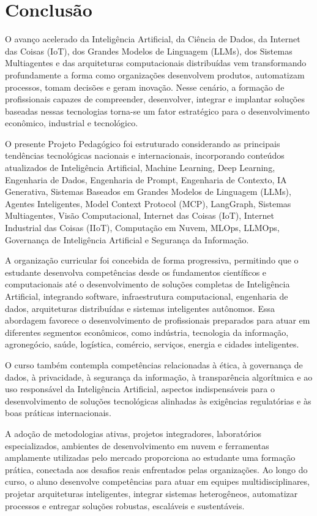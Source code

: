 \chapter{Conclusão}

O avanço acelerado da Inteligência Artificial, da Ciência de Dados, da Internet das Coisas (IoT), dos Grandes Modelos de Linguagem (LLMs), dos Sistemas Multiagentes e das arquiteturas computacionais distribuídas vem transformando profundamente a forma como organizações desenvolvem produtos, automatizam processos, tomam decisões e geram inovação. Nesse cenário, a formação de profissionais capazes de compreender, desenvolver, integrar e implantar soluções baseadas nessas tecnologias torna-se um fator estratégico para o desenvolvimento econômico, industrial e tecnológico.

O presente Projeto Pedagógico foi estruturado considerando as principais tendências tecnológicas nacionais e internacionais, incorporando conteúdos atualizados de Inteligência Artificial, Machine Learning, Deep Learning, Engenharia de Dados, Engenharia de Prompt, Engenharia de Contexto, IA Generativa, Sistemas Baseados em Grandes Modelos de Linguagem (LLMs), Agentes Inteligentes, Model Context Protocol (MCP), LangGraph, Sistemas Multiagentes, Visão Computacional, Internet das Coisas (IoT), Internet Industrial das Coisas (IIoT), Computação em Nuvem, MLOps, LLMOps, Governança de Inteligência Artificial e Segurança da Informação.

A organização curricular foi concebida de forma progressiva, permitindo que o estudante desenvolva competências desde os fundamentos científicos e computacionais até o desenvolvimento de soluções completas de Inteligência Artificial, integrando software, infraestrutura computacional, engenharia de dados, arquiteturas distribuídas e sistemas inteligentes autônomos. Essa abordagem favorece o desenvolvimento de profissionais preparados para atuar em diferentes segmentos econômicos, como indústria, tecnologia da informação, agronegócio, saúde, logística, comércio, serviços, energia e cidades inteligentes.

O curso também contempla competências relacionadas à ética, à governança de dados, à privacidade, à segurança da informação, à transparência algorítmica e ao uso responsável da Inteligência Artificial, aspectos indispensáveis para o desenvolvimento de soluções tecnológicas alinhadas às exigências regulatórias e às boas práticas internacionais.

A adoção de metodologias ativas, projetos integradores, laboratórios especializados, ambientes de desenvolvimento em nuvem e ferramentas amplamente utilizadas pelo mercado proporciona ao estudante uma formação prática, conectada aos desafios reais enfrentados pelas organizações. Ao longo do curso, o aluno desenvolve competências para atuar em equipes multidisciplinares, projetar arquiteturas inteligentes, integrar sistemas heterogêneos, automatizar processos e entregar soluções robustas, escaláveis e sustentáveis.

